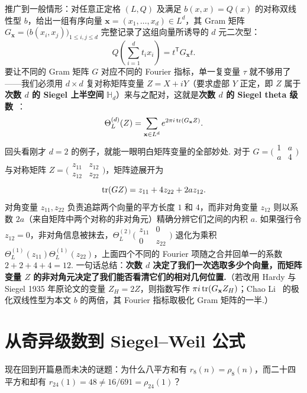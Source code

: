 推广到一般情形：对任意正定格 $(L,Q)$ 及满足 $b(x,x)=Q(x)$ 的对称双线性型 $b$，给出一组有序向量 $\mathbf x=(x_1,\ldots,x_d)\in L^d$，其 Gram 矩阵 $G_{\mathbf x}=\bigl(b(x_i,x_j)\bigr)_{1\le i,j\le d}$ 完整记录了这组向量所诱导的 $d$ 元二次型：
\[
Q\!\left(\sum_{i=1}^{d} t_i x_i\right)=t^{\mathsf T}G_{\mathbf x}t.
\]
要让不同的 Gram 矩阵 $G$ 对应不同的 Fourier 指标，单一复变量 $\tau$ 就不够用了——我们必须用 $d\times d$ 复对称矩阵变量 $Z=X+iY$（要求虚部 $Y$ 正定，即 $Z$ 属于\textbf{次数 $d$ 的 Siegel 上半空间} $\mathbb H_d$）来与之配对，这就是\textbf{次数 $d$ 的 Siegel theta 级数}~\cite[定义~2.1.1]{Li2023}：
\[
\Theta_L^{(d)}(Z)=\sum_{\mathbf x\in L^d}e^{2\pi i\operatorname{tr}(G_{\mathbf x}Z)}.
\]
回头看刚才 $d=2$ 的例子，就能一眼明白矩阵变量的全部妙处. 对于 $G=\bigl(\begin{smallmatrix}1&a\\a&4\end{smallmatrix}\bigr)$ 与对称矩阵 $Z=\bigl(\begin{smallmatrix}z_{11}&z_{12}\\z_{12}&z_{22}\end{smallmatrix}\bigr)$，矩阵迹展开为
\[
\operatorname{tr}(GZ)=z_{11}+4z_{22}+2az_{12}.
\]
对角变量 $z_{11},z_{22}$ 负责追踪两个向量的平方长度 $1$ 和 $4$，而非对角变量 $z_{12}$ 则以系数 $2a$（来自矩阵中两个对称的非对角元）精确分辨它们之间的内积 $a$. 如果强行令 $z_{12}=0$，非对角信息被抹去，$\Theta_L^{(2)}\!\bigl(\begin{smallmatrix}z_{11}&0\\0&z_{22}\end{smallmatrix}\bigr)$ 退化为乘积 $\Theta_L^{(1)}(z_{11})\Theta_L^{(1)}(z_{22})$，上面四个不同的 Fourier 项随之合并回单一的系数 $2+2+4+4=12$. 一句话总结：\textbf{次数 $d$ 决定了我们一次选取多少个向量，而矩阵变量 $Z$ 的非对角元决定了我们能否看清它们的相对几何位置.}（若改用 Hardy 与 Siegel 1935 年原论文的变量 $Z_H=2Z$，则指数写作 $\pi i\operatorname{tr}(G_{\mathbf x}Z_H)$；Chao Li~\cite{Li2023} 的极化双线性型为本文 $b$ 的两倍，其 Fourier 指标取极化 Gram 矩阵的一半.）

\section{从奇异级数到 Siegel--Weil 公式}

现在回到开篇悬而未决的谜题：为什么八平方和有 $r_8(n)=\rho_8(n)$，而二十四平方和却有 $r_{24}(1)=48\ne 16/691=\rho_{24}(1)$？

